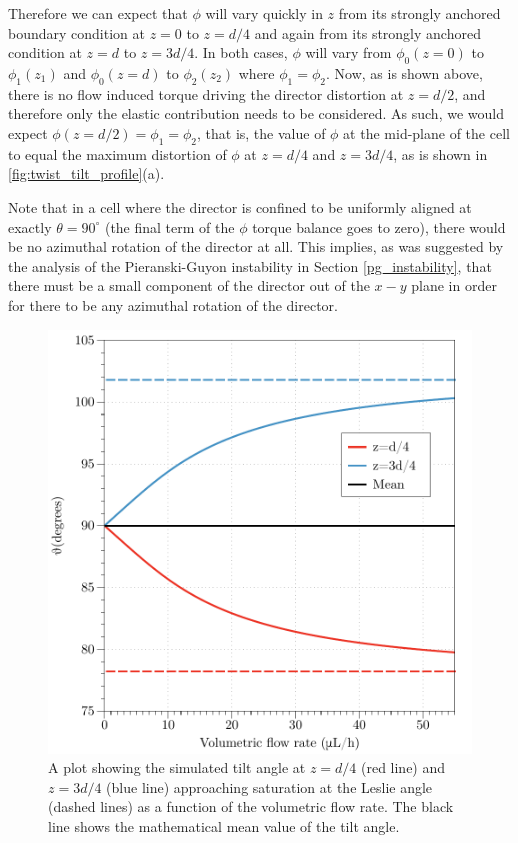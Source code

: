 Therefore we can expect that $\phi$ will vary quickly in $z$ from its strongly anchored boundary condition at $z=0$ to $z=d/4$ and again from its strongly anchored condition at $z=d$ to $z=3d/4$. In both cases, $\phi$ will vary from $\phi_0\left(z=0\right)$ to $\phi_1\left(z_1\right)$ and $\phi_0\left(z=d\right)$ to $\phi_2\left(z_2\right)$ where $\phi_1=\phi_2$. Now, as is shown above, there is no flow induced torque driving the director distortion at $z=d/2$, and therefore only the elastic contribution needs to be considered. As such, we would expect $\phi\left(z=d/2\right)=\phi_1=\phi_2$, that is, the value of $\phi$ at the mid-plane of the cell to equal the maximum distortion of $\phi$ at $z=d/4$ and $z=3d/4$, as is shown in \ref{fig:twist_tilt_profile}(a).

Note that in a cell where the director is confined to be uniformly aligned at exactly $\theta=90^{\circ}$ (the final term of the $\phi$ torque balance goes to zero), there would be no azimuthal rotation of the director at all. This implies, as was suggested by the analysis of the Pieranski-Guyon instability in Section \ref{pg_instability}, that there must be a small component of the director out of the $x-y$ plane in order for there to be any azimuthal rotation of the director.

\begin{figure}
\begin{center}
\includegraphics{Figures/45/leslie_angle}
\end{center}
\caption[Simulated tilt angle of the director saturating at $\theta_l$ at $z=d/4$ and $z=3d/4$]{\label{fig:leslie_angle}A plot showing the simulated tilt angle at $z=d/4$ (red line) and $z=3d/4$ (blue line) approaching saturation at the Leslie angle (dashed lines) as a function of the volumetric flow rate. The black line shows the mathematical mean value of the tilt angle.}
\end{figure}

